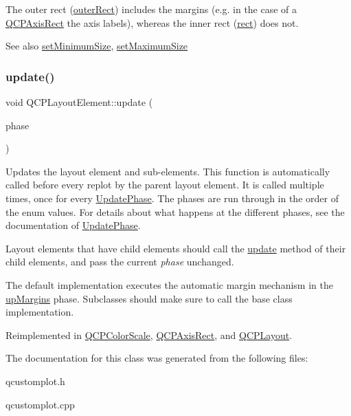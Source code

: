 The outer rect (\hyperlink{classQCPLayoutElement_a2a32a12a6161c9dffbadeb9cc585510c}{outer\+Rect}) includes the margins (e.\+g. in the case of a \hyperlink{classQCPAxisRect}{Q\+C\+P\+Axis\+Rect} the axis labels), whereas the inner rect (\hyperlink{classQCPLayoutElement_a208effccfe2cca4a0eaf9393e60f2dd4}{rect}) does not.

\begin{DoxySeeAlso}{See also}
\hyperlink{classQCPLayoutElement_a5dd29a3c8bc88440c97c06b67be7886b}{set\+Minimum\+Size}, \hyperlink{classQCPLayoutElement_a74eb5280a737ab44833d506db65efd95}{set\+Maximum\+Size} 
\end{DoxySeeAlso}
\mbox{\label{classQCPLayoutElement_a929c2ec62e0e0e1d8418eaa802e2af9b}} 
\subsubsection{\texorpdfstring{update()}{update()}}
{\footnotesize\ttfamily void Q\+C\+P\+Layout\+Element\+::update (\begin{DoxyParamCaption}\item[{\hyperlink{classQCPLayoutElement_a0d83360e05735735aaf6d7983c56374d}{Update\+Phase}}]{phase }\end{DoxyParamCaption})\hspace{0.3cm}{\ttfamily [virtual]}}

Updates the layout element and sub-\/elements. This function is automatically called before every replot by the parent layout element. It is called multiple times, once for every \hyperlink{classQCPLayoutElement_a0d83360e05735735aaf6d7983c56374d}{Update\+Phase}. The phases are run through in the order of the enum values. For details about what happens at the different phases, see the documentation of \hyperlink{classQCPLayoutElement_a0d83360e05735735aaf6d7983c56374d}{Update\+Phase}.

Layout elements that have child elements should call the \hyperlink{classQCPLayoutElement_a929c2ec62e0e0e1d8418eaa802e2af9b}{update} method of their child elements, and pass the current {\itshape phase} unchanged.

The default implementation executes the automatic margin mechanism in the \hyperlink{classQCPLayoutElement_a0d83360e05735735aaf6d7983c56374da288cb59a92280e47261a341f2813e676}{up\+Margins} phase. Subclasses should make sure to call the base class implementation. 

Reimplemented in \hyperlink{classQCPColorScale_a259dcb6d3053a2cc3c197e9b1191ddbe}{Q\+C\+P\+Color\+Scale}, \hyperlink{classQCPAxisRect_add049d464b9ef2ccdc638adc4ccb4aca}{Q\+C\+P\+Axis\+Rect}, and \hyperlink{classQCPLayout_a48ecc9c98ea90b547c3e27a931a8f7bd}{Q\+C\+P\+Layout}.



The documentation for this class was generated from the following files\+:\begin{DoxyCompactItemize}
\item 
qcustomplot.\+h\item 
qcustomplot.\+cpp\end{DoxyCompactItemize}
